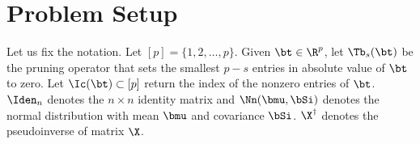 
\section{Problem Setup}\label{sec:setup}
Let us fix the notation. Let $[p]=\{1,2,\dots,p\}$. Given $\bt\in \R^p$, let $\Tb_s(\bt)$ be the pruning operator that sets the smallest $p-s$ entries in absolute value of $\bt$ to zero. Let $\Ic(\bt)\subset[p]$ return the index of the nonzero entries of $\bt$. $\Iden_n$ denotes the $n\times n$ identity matrix and $\Nn(\bmu,\bSi)$ denotes the normal distribution with mean $\bmu$ and covariance $\bSi$. $\X^\dagger$ denotes the pseudoinverse of matrix $\X$. %

